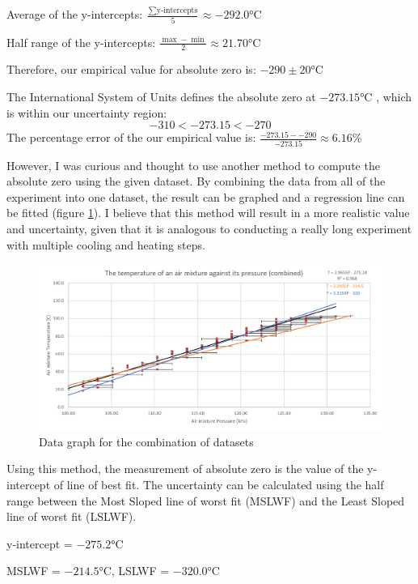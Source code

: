 \documentclass[a4paper,12pt]{article}
\begin{document}
Average of the y-intercepts: $\frac{\sum \text{y-intercepts}}{5} \approx -292.0 \si{\celsius}$

Half range of the y-intercepts: $\frac{\max - \min}{2} \approx 21.70 \si{\celsius}$

Therefore, our empirical value for absolute zero is: $-290 \pm 20 \si{\celsius}$

The International System of Units defines the absolute zero at $-273.15\si{\celsius}$ \parencite{si_form}, which is within our uncertainty region: \[-310 < -273.15 < -270\] The percentage error of the our empirical value is: $\frac{-273.15- -290}{-273.15} \approx 6.16\%$

However, I was curious and thought to use another method to compute the absolute zero using the given dataset. By combining the data from all of the experiment into one dataset, the result can be graphed and a regression line can be fitted (figure \ref{fig:comb}). I believe that this method will result in a more realistic value and uncertainty, given that it is analogous to conducting a really long experiment with multiple cooling and heating steps.

\begin{figure}[H]
    \centering
    \includegraphics[width=\textwidth]{assets/combinedgraph.png}
    \caption{Data graph for the combination of datasets}
    \label{fig:comb}
\end{figure}

Using this method, the measurement of absolute zero is the value of the y-intercept of line of best fit. The uncertainty can be calculated using the half range between the Most Sloped line of worst fit (MSLWF) and the Least Sloped line of worst fit (LSLWF).

y-intercept = $-275.2\si{\celsius}$

MSLWF = $-214.5\si{\celsius}$, LSLWF = $-320.0\si{\celsius}$
\end{document}

